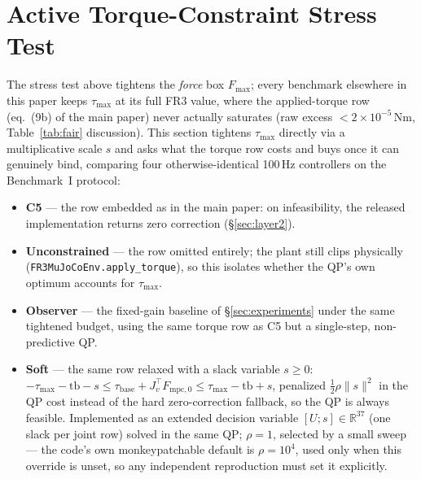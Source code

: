 \documentclass[journal]{IEEEtran}
\newcommand{\Fmpck}[1]{F_{\text{mpc},#1}}
\begin{document}
\section{Active Torque-Constraint Stress Test}\label{sec:tauactive}

The stress test above tightens the \emph{force} box $F_\text{max}$; every
benchmark elsewhere in this paper keeps $\tau_\text{max}$ at its full FR3
value, where the applied-torque row (eq.~(9b) of the main paper) never
actually saturates (raw excess $<2\times10^{-5}$\,Nm, Table~\ref{tab:fair} discussion).
This section tightens $\tau_\text{max}$ directly via a multiplicative
scale $s$ and asks what the torque row costs and buys once it can
genuinely bind, comparing four otherwise-identical 100\,Hz controllers on
the Benchmark~I protocol:

\begin{itemize}[leftmargin=*,itemsep=1pt,topsep=2pt]
\item \textbf{C5} --- the row embedded as in the main paper: on
infeasibility, the released implementation returns zero correction
(\S\ref{sec:layer2}).
\item \textbf{Unconstrained} --- the row omitted entirely; the plant
still clips physically (\texttt{FR3MuJoCoEnv.apply\_torque}), so this
isolates whether the QP's own optimum accounts for $\tau_\text{max}$.
\item \textbf{Observer} --- the fixed-gain baseline of
\S\ref{sec:experiments} under the same tightened budget, using the same
torque row as C5 but a single-step, non-predictive QP.
\item \textbf{Soft} --- the same row relaxed with a slack variable
$s\ge0$: $-\tau_\text{max}-\text{tb}-s\le\tau_\text{base}+J_v^\top\Fmpck{0}\le\tau_\text{max}-\text{tb}+s$,
penalized $\tfrac12\rho\|s\|^2$ in the QP cost instead of the hard
zero-correction fallback, so the QP is always feasible. Implemented as an
extended decision variable $[U;s]\in\mathbb R^{37}$ (one slack per joint
row) solved in the same QP; $\rho=1$, selected by a
small sweep --- the code's own monkeypatchable default is $\rho=10^4$,
used only when this override is unset, so any independent reproduction
must set it explicitly.
\end{itemize}
\end{document}
